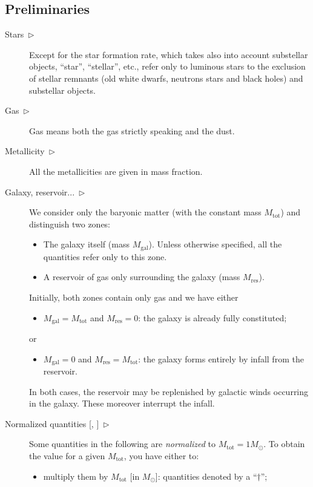 \documentclass[11pt,draft,fleqn]{article}
\begin{document}
\subsection{Preliminaries}
\begin{description}
\item[Stars~$\triangleright$]Except for the star formation rate, which
takes also into account substellar objects, ``star'', ``stellar'',
etc., refer only to luminous stars to the exclusion of 
stellar remnants (old white dwarfs, neutrons stars and black holes)
and substellar objects.
\item[Gas~$\triangleright$]Gas means both the gas strictly speaking
and the dust.
\item[Metallicity~$\triangleright$]All the metallicities are given in
mass fraction.
\item[Galaxy, reservoir...~$\triangleright$]We 
consider only the baryonic matter (with the constant mass 
$M_{\mathrm{tot}}$) and distinguish two zones:
\begin{itemize}
\item
The galaxy itself (mass $M_{\mathrm{gal}}$). Unless otherwise specified, all the quantities
refer only to this zone.
\item
A reservoir of gas only surrounding the galaxy (mass $M_{\mathrm{res}}$).
\end{itemize}
Initially, both zones contain only gas and we have either 
\begin{itemize}
\item $M_{\mathrm{gal}}=M_{\mathrm{tot}}$ and $M_{\mathrm{res}}=
0$: the galaxy is already fully constituted;
\end{itemize}
or
\begin{itemize}
\item $M_{\mathrm{gal}}=0$ and $M_{\mathrm{res}}=
M_{\mathrm{tot}}$: the galaxy forms entirely by infall from the reservoir.
\end{itemize}
In both cases, the reservoir may be replenished by galactic
winds occurring in the galaxy. These moreover interrupt the infall.
\item[Normalized quantities {[\dag, \ddag]}~$\triangleright$]Some quantities in the following are 
\emph{normalized}
to $M_{\mathrm{tot}}=1M_{\odot}$.
To obtain the value for a given $M_{\mathrm{tot}}$,
you have either to:
\begin{itemize}
\item multiply them by $M_{\mathrm{tot}}$ [in $M_{\odot}$]: quantities
denoted by a ``$\dag$'';
\end{itemize}

\end{description}
\end{document}
